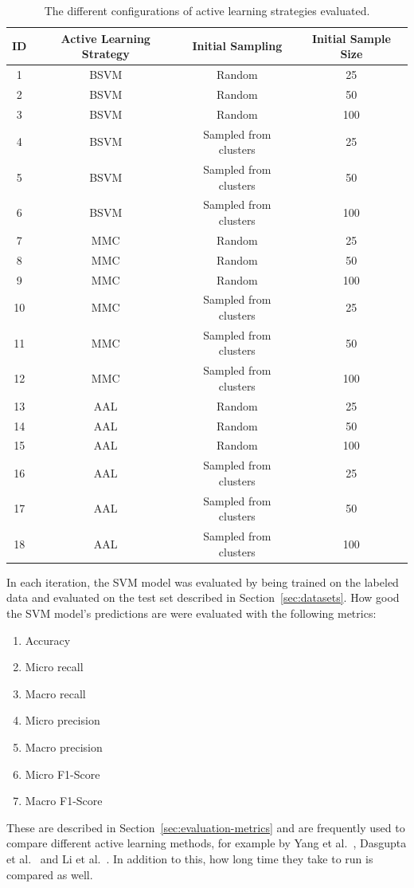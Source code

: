 \begin{table}
    \centering
    \begin{tabular}{|cccc|}
        \hline
        \textbf{ID} & \textbf{Active Learning Strategy} & \textbf{Initial Sampling} & \textbf{Initial Sample Size}\\
        \hline
        1 & BSVM & Random & 25\\
        2 & BSVM & Random & 50\\
        3 & BSVM & Random & 100\\
        4 & BSVM & Sampled from clusters & 25\\
        5 & BSVM & Sampled from clusters & 50\\
        6 & BSVM & Sampled from clusters & 100\\
        7 & MMC & Random & 25\\
        8 & MMC & Random & 50\\
        9 & MMC & Random & 100\\
        10 & MMC & Sampled from clusters & 25\\
        11 & MMC & Sampled from clusters & 50\\
        12 & MMC & Sampled from clusters & 100\\
        13 & AAL & Random & 25\\
        14 & AAL & Random & 50\\
        15 & AAL & Random & 100\\
        16 & AAL & Sampled from clusters & 25\\
        17 & AAL & Sampled from clusters & 50\\
        18 & AAL & Sampled from clusters & 100\\
        \hline
    \end{tabular}
    \caption{The different configurations of active learning strategies evaluated.}
    \label{fig:active-learning-configurations}
\end{table}


In each iteration, the SVM model was evaluated by being trained on the labeled data and evaluated on the test set described in Section~\ref{sec:datasets}.
How good the SVM model's predictions are were evaluated with the following metrics:
\begin{enumerate}
    \item Accuracy
    \item Micro recall
    \item Macro recall
    \item Micro precision
    \item Macro precision
    \item Micro F1-Score
    \item Macro F1-Score
\end{enumerate}
These are described in Section~\ref{sec:evaluation-metrics} and are frequently used to compare different active learning methods, for example by Yang et al\@.~\cite{yang2009effective}, Dasgupta et al\@.~\cite{dasgupta2008hierarchical} and Li et al\@.~\cite{li2013active}.
In addition to this, how long time they take to run is compared as well.

